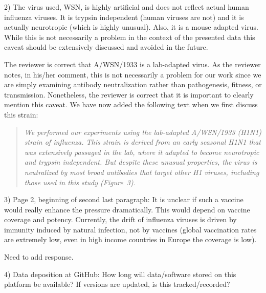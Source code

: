 \documentclass[11pt, oneside]{article}   	%
\begin{document}
2) The virus used, WSN, is highly artificial and does not reflect actual human influenza viruses. It is trypsin independent (human viruses are not) and it is actually neurotropic (which is highly unusual). Also, it is a mouse adapted virus. While this is not necessarily a problem in the context of the presented data this caveat should be extensively discussed and avoided in the future.

{\color{black}
The reviewer is correct that A/WSN/1933 is a lab-adapted virus.
As the reviewer notes, in his/her comment, this is not necessarily a problem for our work since we are simply examining antibody neutralization rather than pathogenesis, fitness, or transmission. 
Nonetheless, the reviewer is correct that it is important to clearly mention this caveat. 
We have now added the following text when we first discuss this strain:

\begin{quote}
\textsl{We performed our experiments using the lab-adapted A/WSN/1933 (H1N1) strain of influenza.
This strain is derived from an early seasonal H1N1 that was extensively passaged in the lab, where it adapted to become neurotropic and trypsin independent.
But despite these unusual properties, the virus is neutralized by most broad antibodies that target other H1 viruses, including those used in this study (Figure~3).}
\end{quote}
}

3) Page 2, beginning of second last paragraph: It is unclear if such a vaccine would really enhance the pressure dramatically. This would depend on vaccine coverage and potency. Currently, the drift of influenza viruses is driven by immunity induced by natural infection, not by vaccines (global vaccination rates are extremely low, even in high income countries in Europe the coverage is low).

{\color{red}
Need to add response.}

4) Data deposition at GitHub: How long will data/software stored on this platform be available? If versions are updated, is this tracked/recorded? 
\end{document}
